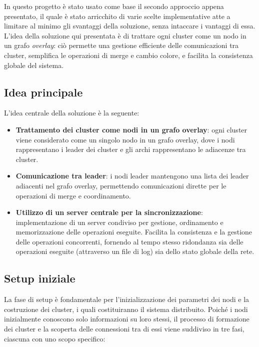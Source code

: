 \documentclass[12pt, a4paper]{report}
\begin{document}
In questo progetto \`e stato usato come base il secondo approccio appena presentato, il quale \`e stato arricchito di varie scelte implementative atte a limitare al minimo gli svantaggi della soluzione, senza intaccare i vantaggi di essa. L'idea della soluzione qui presentata \`e di trattare ogni cluster come un nodo in un grafo \emph{overlay}: ci\`o permette una gestione efficiente delle comunicazioni tra cluster, semplifica le operazioni di merge e cambio colore, e facilita la consistenza globale del sistema.

\subsection{Idea principale}

L'idea centrale della soluzione \`e la seguente:

\begin{itemize}
    \item \textbf{Trattamento dei cluster come nodi in un grafo overlay}: ogni cluster viene considerato come un singolo nodo in un grafo overlay, dove i nodi rappresentano i leader dei cluster e gli archi rappresentano le adiacenze tra cluster.
    \item \textbf{Comunicazione tra leader}: i nodi leader mantengono una lista dei leader adiacenti nel grafo overlay, permettendo comunicazioni dirette per le operazioni di merge e coordinamento.
    \item \textbf{Utilizzo di un server centrale per la sincronizzazione}: implementazione di un server condiviso per gestione, ordinamento e memorizzazione delle operazioni eseguite. Facilita la consistenza e la gestione delle operazioni concorrenti, fornendo al tempo stesso ridondanza sia delle operazioni eseguite (attraverso un file di log) sia dello stato globale della rete.
\end{itemize}

\subsection{Setup iniziale}\label{subsec:setup}

La fase di setup \`e fondamentale per l'inizializzazione dei parametri dei nodi e la costruzione dei cluster, i quali costituiranno il sistema distribuito. Poiché i nodi inizialmente conoscono solo informazioni su loro stessi, il processo di formazione dei cluster e la scoperta delle connessioni tra di essi viene suddiviso in tre fasi, ciascuna con uno scopo specifico:
\end{document}
